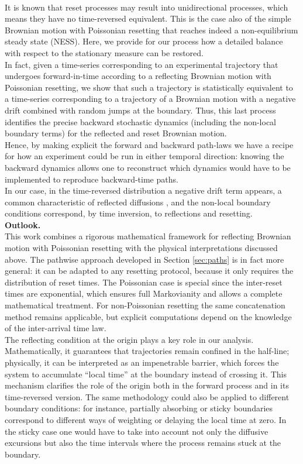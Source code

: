 \documentclass[11pt,a4paper]{article}
\theoremstyle{definition}
\theoremstyle{remark}
\begin{document}
	\\
	It is known that reset processes may result into unidirectional processes, which means they have no time-reversed equivalent. This is the case also of the simple Brownian motion with Poissonian resetting that reaches indeed a non-equilibrium steady state (NESS). Here, we provide for our process how a detailed balance with respect to the stationary measure can be restored.
	\\
	In fact, given a time-series corresponding to an experimental trajectory that undergoes forward-in-time according to a reflecting Brownian motion with Poissonian resetting, we show that such a trajectory is statistically equivalent to a time-series corresponding to a trajectory of a Brownian motion with a negative drift combined with random jumps at the boundary. Thus, this last process identifies the precise backward stochastic dynamics (including the non-local boundary terms) for the reflected and reset Brownian motion.
	\\
	Hence, by making explicit the forward and backward path-laws we have a recipe for how an experiment could be run in either temporal direction: knowing the backward dynamics allows one to reconstruct which dynamics would have to be implemented to reproduce backward-time paths.
	\\
	In our case, in the time-reversed distribution a negative drift term appears, a common characteristic of reflected diffusions \cite{reverse-reflected}, and the non-local boundary conditions correspond, by time inversion, to reflections and resetting.\\
	\textbf{Outlook.}\\
	This work combines a rigorous mathematical framework for reflecting Brownian motion with Poissonian resetting with the physical interpretations discussed above. The pathwise approach developed in Section \ref{sec:paths} is in fact more general: it can be adapted to any resetting protocol, because it only requires the distribution of reset times. The Poissonian case is special since the inter-reset times are exponential, which ensures full Markovianity and allows a complete mathematical treatment. For non-Poissonian resetting the same concatenation method remains applicable, but explicit computations depend on the knowledge of the inter-arrival time law.
	\\
	The reflecting condition at the origin plays a key role in our analysis. Mathematically, it guarantees that trajectories remain confined in the half-line; physically, it can be interpreted as an impenetrable barrier, which forces the system to accumulate “local time” at the boundary instead of crossing it. This mechanism clarifies the role of the origin both in the forward process and in its time-reversed version. The same methodology could also be applied to different boundary conditions: for instance, partially absorbing or sticky boundaries correspond to different ways of weighting or delaying the local time at zero. In the sticky case one would have to take into account not only the diffusive excursions but also the time intervals where the process remains stuck at the boundary.
\end{document}
